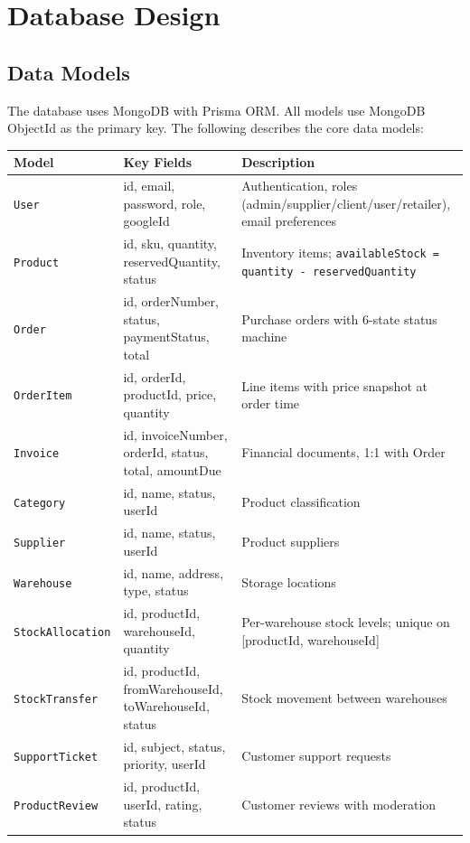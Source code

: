 ﻿\documentclass[12pt,a4paper]{report}
\newcommand{\model}[1]{\texttt{\color{accent}#1}}
\begin{document}
\section{Database Design}

\subsection{Data Models}

The database uses MongoDB with Prisma ORM. All models use MongoDB ObjectId as the primary key. The following describes the core data models:

\begin{center}
\begin{longtable}{llp{7cm}}
  \toprule
  \textbf{Model} & \textbf{Key Fields} & \textbf{Description} \\
  \midrule
  \endhead
  \model{User}            & id, email, password, role, googleId & Authentication, roles (admin/supplier/client/user/retailer), email preferences \\
  \model{Product}         & id, sku, quantity, reservedQuantity, status & Inventory items; \texttt{availableStock = quantity - reservedQuantity} \\
  \model{Order}           & id, orderNumber, status, paymentStatus, total & Purchase orders with 6-state status machine \\
  \model{OrderItem}       & id, orderId, productId, price, quantity & Line items with price snapshot at order time \\
  \model{Invoice}         & id, invoiceNumber, orderId, status, total, amountDue & Financial documents, 1:1 with Order \\
  \model{Category}        & id, name, status, userId & Product classification \\
  \model{Supplier}        & id, name, status, userId & Product suppliers \\
  \model{Warehouse}       & id, name, address, type, status & Storage locations \\
  \model{StockAllocation} & id, productId, warehouseId, quantity & Per-warehouse stock levels; unique on [productId, warehouseId] \\
  \model{StockTransfer}   & id, productId, fromWarehouseId, toWarehouseId, status & Stock movement between warehouses \\
  \model{SupportTicket}   & id, subject, status, priority, userId & Customer support requests \\
  \model{ProductReview}   & id, productId, userId, rating, status & Customer reviews with moderation \\

\end{longtable}
\end{center}
\end{document}
